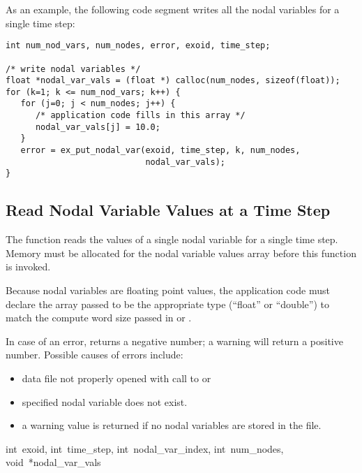 As an example, the following code segment writes all the nodal
variables for a single time step:

\begin{lstlisting}
int num_nod_vars, num_nodes, error, exoid, time_step;

/* write nodal variables */
float *nodal_var_vals = (float *) calloc(num_nodes, sizeof(float));
for (k=1; k <= num_nod_vars; k++) {
   for (j=0; j < num_nodes; j++) {
      /* application code fills in this array */
      nodal_var_vals[j] = 10.0;
   }
   error = ex_put_nodal_var(exoid, time_step, k, num_nodes,
                            nodal_var_vals);
}
\end{lstlisting}

\subsection{Read Nodal Variable Values at a Time Step}

The function  reads the values of a single
nodal variable for a single time step. Memory must be allocated for
the nodal variable values array before this function is invoked.


Because nodal variables are floating point values, the application
code must declare the array passed to be the appropriate type
(``float'' or ``double'') to match the compute word size passed in
 or .

In case of an error,  returns a negative
number; a warning will return a positive number. Possible causes of
errors include:
\begin{itemize}
 \item data file not properly opened with call to 
 or 

 \item specified nodal variable does not exist.

 \item a warning value is returned if no nodal variables are stored in
 the file.
\end{itemize}

{int~exoid,
int~time_step,
int~nodal_var_index,
int~num_nodes,
void~*nodal_var_vals}

